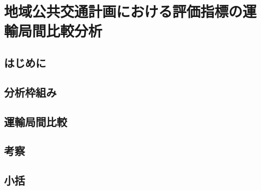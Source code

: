 
\chapter{地域公共交通計画における評価指標の運輸局間比較分析}
\label{chap:regional_transport_comparison}

\begin{center}
\end{center}

\vspace{1em}

\section{はじめに}
\label{sec:ch3_5_intro}


\section{分析枠組み}
\label{sec:ch3_5_framework}


\section{運輸局間比較}
\label{sec:ch3_5_comparison}


\section{考察}
\label{sec:ch3_5_discussion}


\section{小括}
\label{sec:ch3_5_summary}



